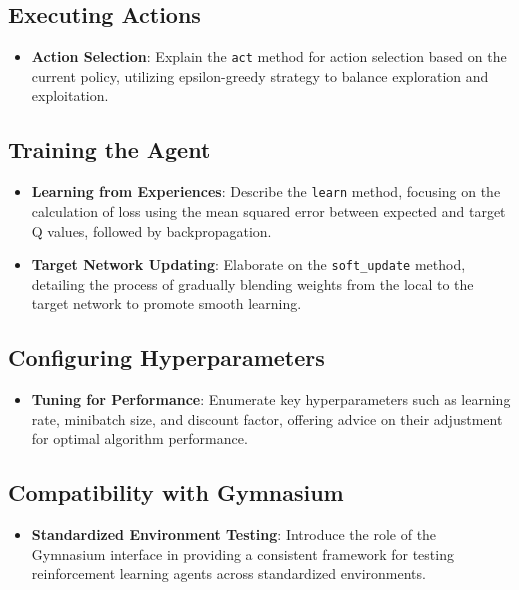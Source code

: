 \subsection{Executing Actions}
\begin{itemize}
    \item \textbf{Action Selection}: Explain the \texttt{act} method for action selection based on the current policy, utilizing epsilon-greedy strategy to balance exploration and exploitation.
\end{itemize}

\subsection{Training the Agent}
\begin{itemize}
    \item \textbf{Learning from Experiences}: Describe the \texttt{learn} method, focusing on the calculation of loss using the mean squared error between expected and target Q values, followed by backpropagation.
    \item \textbf{Target Network Updating}: Elaborate on the \texttt{soft\_update} method, detailing the process of gradually blending weights from the local to the target network to promote smooth learning.
\end{itemize}

\subsection{Configuring Hyperparameters}
\begin{itemize}
    \item \textbf{Tuning for Performance}: Enumerate key hyperparameters such as learning rate, minibatch size, and discount factor, offering advice on their adjustment for optimal algorithm performance.
\end{itemize}

\subsection{Compatibility with Gymnasium}
\begin{itemize}
    \item \textbf{Standardized Environment Testing}: Introduce the role of the Gymnasium interface in providing a consistent framework for testing reinforcement learning agents across standardized environments.
\end{itemize}
